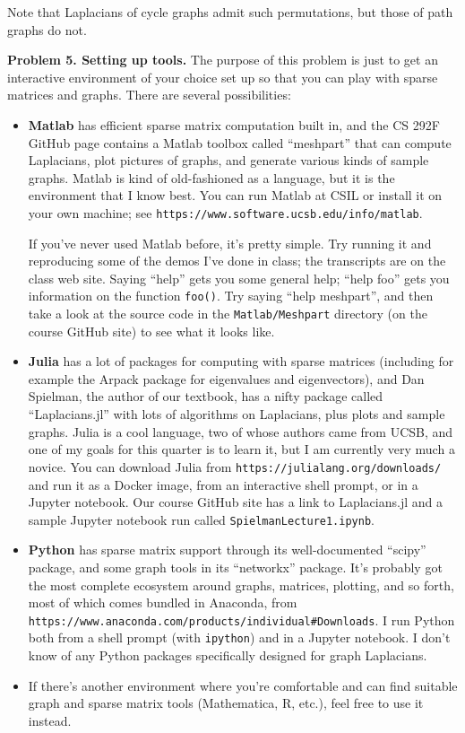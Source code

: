 \documentclass[11pt]{article}
\begin{document}
Note that Laplacians of cycle graphs admit such permutations,
but those of path graphs do not.

\par\bigskip
{\bf Problem 5. Setting up tools.} 
The purpose of this problem is just to get an interactive environment
of your choice set up so that you can play with sparse matrices and
graphs.
There are several possibilities:

\begin{itemize}

\item {\bf Matlab} has efficient sparse matrix computation built in,
and the CS 292F GitHub page contains a Matlab toolbox called ``meshpart''
that can compute Laplacians, plot pictures of graphs, and generate
various kinds of sample graphs. 
Matlab is kind of old-fashioned as a language,
but it is the environment that I know best.
You can run Matlab at CSIL or install it on your own machine;
see {\tt https://www.software.ucsb.edu/info/matlab}.
\par
If you've never used Matlab before, it's pretty simple.
Try running it and reproducing some of the demos I've done in class;
the transcripts are on the class web site.
Saying ``help'' gets you some general help;
``help foo'' gets you information on the function {\tt foo()}.
Try saying ``help meshpart'', and then take a look at
the source code in the {\tt Matlab/Meshpart} directory 
(on the course GitHub site) to see what it looks like.

\item {\bf Julia} has a lot of packages for computing with sparse matrices
(including for example the Arpack package for eigenvalues and eigenvectors),
and Dan Spielman, the author of our textbook, has a nifty package called
``Laplacians.jl'' with lots of algorithms on Laplacians, 
plus plots and sample graphs.
Julia is a cool language, two of whose authors came from UCSB, 
and one of my goals for this quarter is to learn it, but I am currently
very much a novice.
You can download Julia from {\tt https://julialang.org/downloads/} and
run it as a Docker image, from an interactive shell prompt, 
or in a Jupyter notebook. Our course GitHub site has a link to Laplacians.jl 
and a sample Jupyter notebook run called {\tt SpielmanLecture1.ipynb}.

\item {\bf Python} has sparse matrix support through its well-documented
``scipy'' package, and some graph tools in its ``networkx'' package.
It's probably got the most complete ecosystem around graphs, matrices,
plotting, and so forth, most of which comes bundled in Anaconda, from 
{\tt https://www.anaconda.com/products/individual\#Downloads}.
I run Python both from a shell prompt (with {\tt ipython}) and 
in a Jupyter notebook.
I don't know of any Python packages specifically designed for
graph Laplacians.

\item If there's another environment where you're comfortable
and can find suitable graph and sparse matrix tools (Mathematica, R, etc.),
feel free to use it instead.

\end{itemize}
\end{document}
